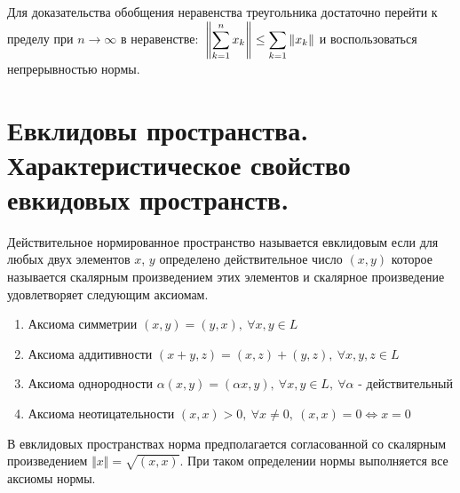 \documentclass[12pt]{report}
\newcommand{\be}{\begin{enumerate}}
\newcommand{\ee}{\end{enumerate}}
\renewcommand{\[}{$\\\displaystyle}
\renewcommand{\]}{\\$}
\renewcommand{\[}{$\\\displaystyle}
\newcommand{\sep}{,\ }
\begin{document}
Для доказательства обобщения неравенства треугольника достаточно перейти к пределу при $n \rightarrow \infty$ в неравенстве:
\[ \left \Vert  \sum_{k=1}^n x_k \right \Vert  \leq \sum_{k=1}  \Vert x_k \Vert \]
и воспользоваться непрерывностью нормы.

\section{Евклидовы пространства. Характеристическое свойство евкидовых пространств.}

Действительное нормированное пространство называется евклидовым если для любых двух элементов $x$, $y$ определено действительное число $(x,y)$ которое называется скалярным произведением этих элементов и скалярное произведение удовлетворяет следующим аксиомам.

\be
  \item Аксиома симметрии $(x,y)=(y,x) \sep \forall x,y \in L$
  \item Аксиома аддитивности $(x + y, z) = (x,z) + (y,z) \sep \forall x,y,z \in L$
  \item Аксиома однородности $\alpha (x,y) = (\alpha x,y) \sep \forall x,y \in L \sep \forall \alpha $ - действительный
  \item Аксиома неотицательности $(x,x) > 0 \sep\forall x\neq 0 \sep (x,x)=0 \Leftrightarrow x=0$
\ee

В евклидовых пространствах норма предполагается согласованной со скалярным произведением $ \Vert x \Vert =\sqrt{(x,x)}$. При таком определении нормы выполняется все аксиомы нормы.


\end{document}
